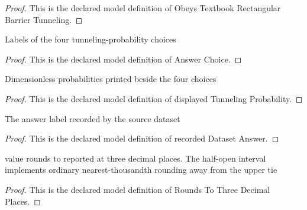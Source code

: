 \begin{proof}
  This is the declared model definition of Obeys Textbook Rectangular Barrier Tunneling.
\end{proof}
\begin{definition}
  \label{def:physics:phyx-mini-0615:phyxminiproblems-problemphyxmini0615-answerchoice}
  Labels of the four tunneling-probability choices
\end{definition}
\begin{proof}
  This is the declared model definition of Answer Choice.
\end{proof}
\begin{definition}
  \label{def:physics:phyx-mini-0615:phyxminiproblems-problemphyxmini0615-displayedtunnelingprobability}
  Dimensionless probabilities printed beside the four choices
\end{definition}
\begin{proof}
  This is the declared model definition of displayed Tunneling Probability.
\end{proof}
\begin{definition}
  \label{def:physics:phyx-mini-0615:phyxminiproblems-problemphyxmini0615-recordeddatasetanswer}
  The answer label recorded by the source dataset
\end{definition}
\begin{proof}
  This is the declared model definition of recorded Dataset Answer.
\end{proof}
\begin{definition}
  \label{def:physics:phyx-mini-0615:phyxminiproblems-problemphyxmini0615-roundstothreedecimalplaces}
  value rounds to reported at three decimal places. The half-open interval implements ordinary nearest-thousandth rounding away from the upper tie
\end{definition}
\begin{proof}
  This is the declared model definition of Rounds To Three Decimal Places.
\end{proof}
